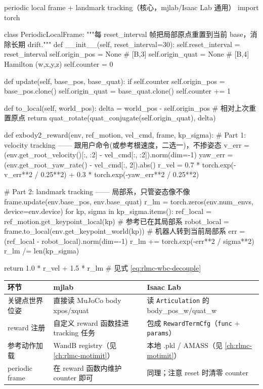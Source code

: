 \begin{codebox}[Python]{periodic local frame + landmark tracking（核心，mjlab/Isaac Lab 通用）}
import torch

class PeriodicLocalFrame:
    """每 reset_interval 帧把局部原点重置到当前 base，消除长期 drift."""
    def __init__(self, reset_interval=30):
        self.reset_interval = reset_interval
        self.origin_pos = None       # [B,3]
        self.origin_quat = None      # [B,4] Hamilton (w,x,y,z)
        self.counter = 0

    def update(self, base_pos, base_quat):
        if self.counter %
            self.origin_pos = base_pos.clone()
            self.origin_quat = base_quat.clone()
        self.counter += 1

    def to_local(self, world_pos):
        delta = world_pos - self.origin_pos                      # 相对上次重置原点
        return quat_rotate(quat_conjugate(self.origin_quat), delta)

def exbody2_reward(env, ref_motion, vel_cmd, frame, kp_sigma):
    # Part 1: velocity tracking —— 跟用户命令(或参考根速度，二选一)，不掺姿态
    v_err = (env.get_root_velocity()[:, :2] - vel_cmd[:, :2]).norm(dim=-1)
    yaw_err = (env.get_root_yaw_rate() - vel_cmd[:, 2]).abs()
    r_vel = 0.7 * torch.exp(-v_err**2 / 0.25**2) + 0.3 * torch.exp(-yaw_err**2 / 0.25**2)

    # Part 2: landmark tracking —— 局部系，只管姿态像不像
    frame.update(env.base_pos, env.base_quat)
    r_lm = torch.zeros(env.num_envs, device=env.device)
    for kp, sigma in kp_sigma.items():
        ref_local   = ref_motion.get_keypoint_local(kp)          # 参考已在其局部系
        robot_local = frame.to_local(env.get_keypoint_world(kp)) # 机器人转到当前局部系
        err = (ref_local - robot_local).norm(dim=-1)
        r_lm += torch.exp(-err**2 / sigma**2)
    r_lm /= len(kp_sigma)

    return 1.0 * r_vel + 1.5 * r_lm                              # 见式 \eqref{eq:rlmc-wbc-decouple}
\end{codebox}

\begin{center}
\small
\begin{tabular}{p{2.0cm}p{4.3cm}p{4.3cm}}
\hline
环节 & mjlab & Isaac Lab \\
\hline
关键点世界位姿 & 直接读 MuJoCo body xpos/xquat & 读 \texttt{Articulation} 的 body\_pos\_w/quat\_w \\
reward 注册 & 自定义 reward 函数挂进 tracking 任务 & 包成 \texttt{RewardTermCfg}（\texttt{func} $+$ \texttt{params}） \\
参考动作加载 & WandB registry（见 \cref{ch:rlmc-motimit}） & 本地 .pkl / AMASS（见 \cref{ch:rlmc-motimit}） \\
periodic frame & 在 reward 函数内维护 counter 即可 & 同理；注意 reset 时清零 counter \\
\hline
\end{tabular}
\end{center}

